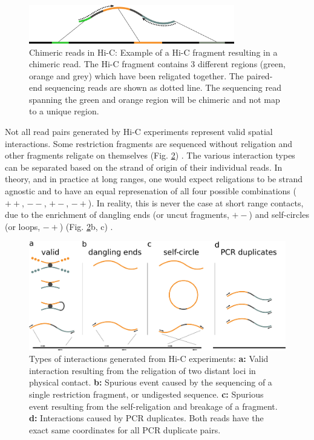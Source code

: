 \begin{figure}[htb]
    \includegraphics[width=0.8\textwidth]{Parts/Part02/gfx/hicstuff/chimeric.pdf}
    \caption[Chimeric reads in Hi-C.]{Chimeric reads in Hi-C: Example of a Hi-C fragment resulting in a chimeric read. The Hi-C fragment contains 3 different regions (green, orange and grey) which have been religated together. The paired-end sequencing reads are shown as dotted line. The sequencing read spanning the green and orange region will be chimeric and not map to a unique region.}
    \label{fig:02-01:chimeric}
\end{figure}

Not all read pairs generated by Hi-C experiments represent valid spatial interactions. Some restriction fragments are sequenced without religation and other fragments religate on themselves (Fig. \ref{fig:02-01:filters}) \cite{cournacNormalizationChromosomalContact2012}. The various interaction types can be separated based on the strand of origin of their individual reads. In theory, and in practice at long ranges, one would expect religations to be strand agnostic and to have an equal represenation of all four possible combinations ($++$, $--$, $+-$, $-+$). In reality, this is never the case at short range contacts, due to the enrichment of dangling ends (or uncut fragments, $+-$) and self-circles (or loops, $-+$) (Fig. \ref{fig:02-01:filters}b, c) \cite{cournacNormalizationChromosomalContact2012}.

\begin{figure}[htb]
    \includegraphics[width=\textwidth]{Parts/Part02/gfx/hicstuff/filters.pdf}
    \caption[Types of interactions generated from Hi-C experiments.]{Types of interactions generated from Hi-C experiments: \textbf{a:} Valid interaction resulting from the religation of two distant loci in physical contact. \textbf{b:} Spurious event caused by the sequencing of a single restriction fragment, or undigested sequence. \textbf{c:} Spurious event resulting from the self-religation and breakage of a fragment. \textbf{d:} Interactions caused by PCR duplicates. Both reads have the exact same coordinates for all PCR duplicate pairs.}
    \label{fig:02-01:filters}
\end{figure}

